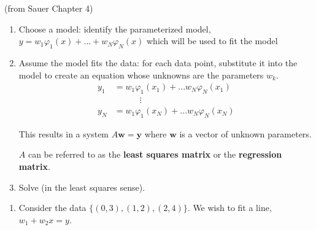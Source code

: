 \documentclass[12pt,letterpaper,noanswers]{exam}
\newcommand{\vc}[1]{\boldsymbol{#1}}
\begin{document}
\begin{tcolorbox}
(from Sauer Chapter 4)

\begin{enumerate}
    \item Choose a model: identify the parameterized model, $y = w_1\varphi_1(x) + ... + w_N\varphi_N(x)$ which will be used to fit the model
    \item Assume the model fits the data: for each data point, substitute it into the model to create an equation whose unknowns are the parameters $w_k$.  
    \begin{align*}
    y_1 &= w_1\varphi_1(x_1)+...w_N\varphi_N(x_1) \\
    & \quad\quad\quad\vdots \\
    y_N &= w_1\varphi_1(x_N)+...w_N\varphi_N(x_N)\end{align*}
    
    This results in a system $A\vc{w} = \vc{y}$ where $\vc{w}$ is a vector of unknown parameters.
    
    $A$ can be referred to as the \textbf{least squares matrix} or the \textbf{regression matrix}.
    \item Solve (in the least squares sense).
\end{enumerate}
\end{tcolorbox}

\begin{enumerate}[resume=classQ]
\item Consider the data $\{(0,3),(1,2),(2,4)\}$.  We wish to fit a line, $w_1 + w_2 x = y$.
\end{enumerate}
\end{document}

